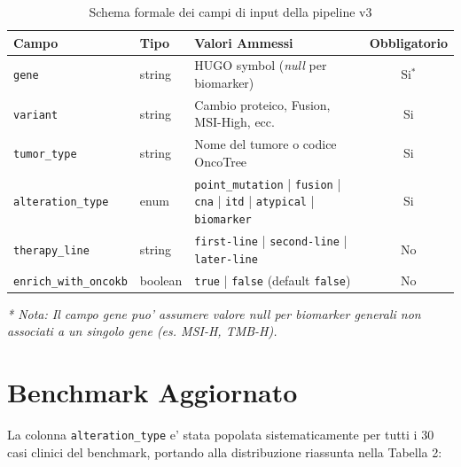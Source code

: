 \documentclass[12pt, a4paper]{article}
\begin{document}
\begin{table}[ht]
\centering\renewcommand{\arraystretch}{1.35}
\caption{Schema formale dei campi di input della pipeline v3}
\begin{tabular}{llp{7cm}c}
\toprule
\rowcolor{primaryblue}
\color{white}\textbf{Campo} & \color{white}\textbf{Tipo} & \color{white}\textbf{Valori Ammessi} & \color{white}\textbf{Obbligatorio} \\
\midrule
\texttt{gene} & string & HUGO symbol (\textit{null} per biomarker) & Si$^*$ \\
\rowcolor{roweven}
\texttt{variant} & string & Cambio proteico, Fusion, MSI-High, ecc. & Si \\
\texttt{tumor\_type} & string & Nome del tumore o codice OncoTree & Si \\
\rowcolor{roweven}
\texttt{alteration\_type} & enum & \texttt{point\_mutation} | \texttt{fusion} | \texttt{cna} | \texttt{itd} | \texttt{atypical} | \texttt{biomarker} & Si \\
\texttt{therapy\_line} & string & \texttt{first-line} | \texttt{second-line} | \texttt{later-line} & No \\
\rowcolor{roweven}
\texttt{enrich\_with\_oncokb} & boolean & \texttt{true} | \texttt{false} (default \texttt{false}) & No \\
\bottomrule
\end{tabular}
\end{table}
\small{\textit{* Nota: Il campo gene puo' assumere valore null per biomarker generali non associati a un singolo gene (es. MSI-H, TMB-H).}}

\section{Benchmark Aggiornato}

La colonna \texttt{alteration\_type} e' stata popolata sistematicamente per tutti i 30 casi clinici del benchmark, portando alla distribuzione riassunta nella Tabella 2:
\end{document}
